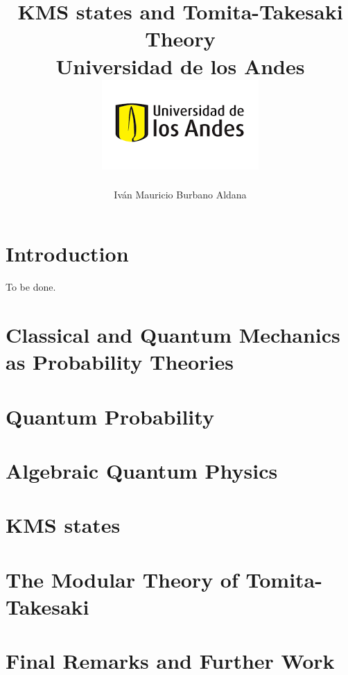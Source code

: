\documentclass[12pt]{report}
\title 
{
	{KMS states and Tomita-Takesaki Theory}\\
	{\large Universidad de los Andes}\\
	{\includegraphics{logo.png}}	
}
\author{Iván Mauricio Burbano Aldana}
\theoremstyle{definition}
\begin{document}
\maketitle

\tableofcontents

\chapter{Introduction}
To be done.

\chapter{Classical and Quantum Mechanics as Probability Theories}


\chapter{Quantum Probability}


\chapter{Algebraic Quantum Physics}


\chapter{KMS states}


\chapter{The Modular Theory of Tomita-Takesaki}


\chapter{Final Remarks and Further Work}



\end{document}
